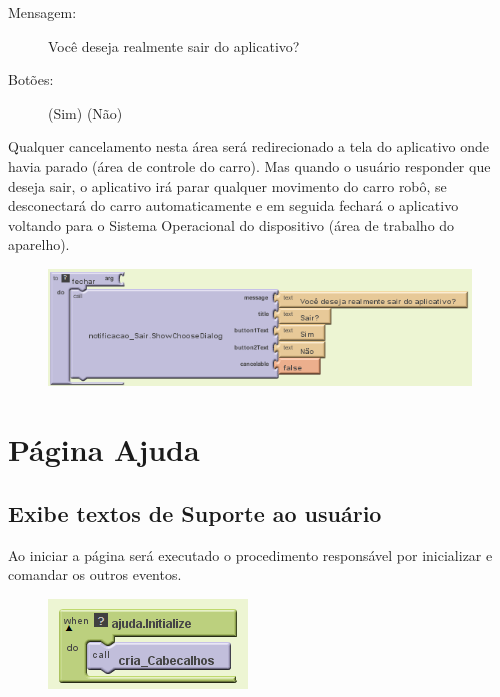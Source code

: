 \documentclass[portugues, brazil, a4paper,12pt]{article}
\begin{document}
\begin{description}
\item[Mensagem: ]Você deseja realmente sair do aplicativo?
\item[Botões: \quad\,\,\,\,](Sim) (Não)
\end{description}

Qualquer cancelamento nesta área será redirecionado a tela do aplicativo onde havia parado (área de controle do carro). Mas quando o usuário responder que deseja sair, o aplicativo irá parar qualquer movimento do carro robô, se desconectará do carro automaticamente e em seguida fechará o aplicativo voltando para o Sistema Operacional do dispositivo (área de trabalho do aparelho).


\begin{figure}[H]
	\centering
	\includegraphics[scale=.8]{img/controle/fechar.png}
	
\end{figure}




\newpage
\section{Página Ajuda}
\subsection{Exibe textos de Suporte ao usuário}
Ao iniciar a página será executado o procedimento responsável por inicializar e comandar os outros eventos.

\begin{figure}[H]
	\centering
	\includegraphics[scale=.8]{img/ajuda/inicio.png}
	
\end{figure}
\end{document}
